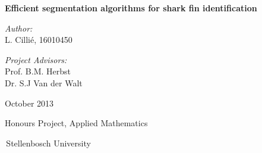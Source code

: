 \documentclass[a4paper,10pt]{article}
\newenvironment{changemargin}[2]{%
\begin{list}{}{%
\setlength{\topsep}{0pt}%
\setlength{\leftmargin}{#1}%
\setlength{\rightmargin}{#2}%
\setlength{\listparindent}{\parindent}%
\setlength{\itemindent}{\parindent}%
\setlength{\parsep}{\parskip}%
}%
\item[]}{\end{list}}
\begin{document}
\begin{titlepage}

\begin{changemargin}{-1cm}{-1cm}
\begin{center}

\begin{minipage}{1.2\textwidth}
\begin{center}
\vspace{2cm}
    {\Huge \bf Efficient segmentation algorithms for shark fin
identification }
\end{center}
\end{minipage}

\vspace{1.3cm}

\begin{minipage}{0.49\textwidth}
\begin{center} \LARGE
\emph{Author:}\\
L. Cilli\'{e}, 16010450
\end{center}
\end{minipage}
\begin{minipage}{0.49\textwidth}
\begin{center} \LARGE
\emph{Project Advisors:} \\
Prof. B.M. Herbst\\Dr. S.J Van der Walt

\end{center}
\end{minipage}

\vspace{1.3cm}
{\LARGE October 2013}

\end{center}

\vfill

\vspace{20mm}
\hfill{\LARGE Honours Project, Applied Mathematics}\hfill\,

\,\hfill{\LARGE Stellenbosch University}\hfill\,

\end{changemargin}

\end{titlepage}

\begin{abstract}
This project investigates the use of various segmentation algorithms as
  part of a larger pipeline for fin identification of Great White sharks.
For this purpose, the Growcut algorithm \cite{alg} is studied in detail.
A pipeline is developed containing various algorithms that form part of the
identification process.  The pipeline can be used to compare new shark fin
images with existing images in a database, establishing whether the shark
has been seen before.  This information can be used to determine a more accurate population estimate in a specific region
and also to keep track of the shark population,
thereby assisting in the conservation of the Great White shark.
\end{abstract}
\end{document}
